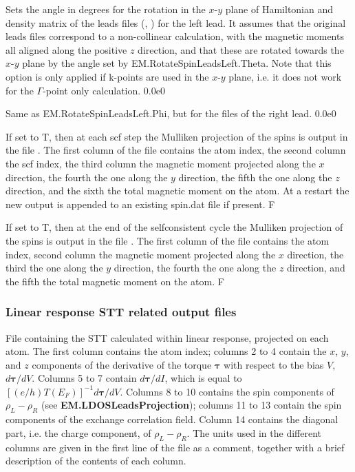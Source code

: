 \documentclass[11pt]{article}
\begin{document}
{
{Sets the angle in degrees for the rotation in the $x$-$y$ plane of Hamiltonian and density matrix of the leads files (, ) for the left lead. It assumes that the original leads files correspond to a non-collinear calculation, with the magnetic moments all aligned along the positive $z$ direction, and that these are rotated towards the $x$-$y$ plane by the angle set by EM.RotateSpinLeadsLeft.Theta. Note that this option is only applied if k-points are used in the $x$-$y$ plane, i.e. it does not work for the $\Gamma$-point only calculation.}
{0.0e0}

{Same as EM.RotateSpinLeadsLeft.Phi, but for the files of the right lead.}
{0.0e0}

{If set to T, then at each scf step the Mulliken projection of the spins is output in the file . The first column of the file contains the atom index, the second column the scf index, the third column the magnetic moment projected along the $x$ direction, the fourth the one along the $y$ direction, the fifth the one along the $z$ direction, and the sixth the total magnetic moment on the atom. At a restart the new output is appended to an existing spin.dat file if present.}
{F}

{If set to T, then at the end of the selfconsistent cycle the Mulliken projection of the spins is output in the file . The first column of the file contains the atom index, second column the magnetic moment projected along the $x$ direction, the third the one along the $y$ direction, the fourth the one along the $z$ direction, and the fifth the total magnetic moment on the atom.}
{F}

\subsubsection{Linear response STT related output files}

\vspace{0.5cm}
{File containing the STT calculated within linear response, projected on each atom. The first column contains the atom index; columns 2 to 4 contain the $x$, $y$, and $z$ components of the derivative of the torque $\bm{\tau}$ with respect to the bias $V$, $d{\bm{\tau}}/dV$. Columns 5 to 7 contain  $d{\bm{\tau}}/dI$, which is equal to $\left[(e/h)T(E_F)\right]^{-1} d{\bm{\tau}}/dV$. Columns 8 to 10 contains the spin components of $\rho_L-\rho_R$ (see {\bf EM.LDOSLeadsProjection}); columns 11 to 13 contain the spin components of the exchange correlation field. Column 14 contains the diagonal part, i.e. the charge component, of $\rho_L-\rho_R$. The units used in the different columns are given in the first line of the file as a comment, together with a brief description of the contents of each column.}

}
\end{document}
